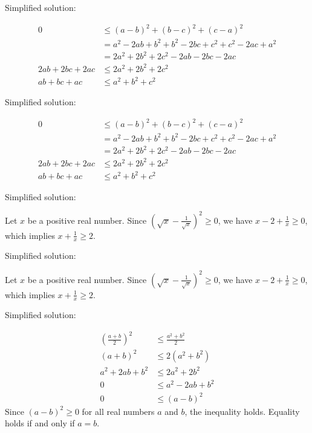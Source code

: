 \documentclass{article}
\begin{document}
Simplified solution:
\begin{tcolorbox}[colback=blue!10, width=\linewidth]
\begin{align*} 0 &\le (a-b)^2 + (b-c)^2 + (c-a)^2 \\ &= a^2 - 2ab + b^2 + b^2 - 2bc + c^2 + c^2 - 2ac + a^2 \\ &= 2a^2 + 2b^2 + 2c^2 - 2ab - 2bc - 2ac \\ 2ab + 2bc + 2ac &\le 2a^2 + 2b^2 + 2c^2 \\ ab + bc + ac &\le a^2 + b^2 + c^2 \end{align*}
\end{tcolorbox}



Simplified solution:
\begin{tcolorbox}[colback=blue!10, width=\linewidth]
\begin{align*} 0 &\le (a-b)^2 + (b-c)^2 + (c-a)^2 \\ &= a^2 - 2ab + b^2 + b^2 - 2bc + c^2 + c^2 - 2ac + a^2 \\ &= 2a^2 + 2b^2 + 2c^2 - 2ab - 2bc - 2ac \\ 2ab + 2bc + 2ac &\le 2a^2 + 2b^2 + 2c^2 \\ ab + bc + ac &\le a^2 + b^2 + c^2 \end{align*}
\end{tcolorbox}



Simplified solution:
\begin{tcolorbox}[colback=blue!10, width=\linewidth]
Let $x$ be a positive real number.  Since $(\sqrt{x} - \frac{1}{\sqrt{x}})^2 \ge 0$, we have $x - 2 + \frac{1}{x} \ge 0$, which implies $x + \frac{1}{x} \ge 2$.
\end{tcolorbox}



Simplified solution:
\begin{tcolorbox}[colback=blue!10, width=\linewidth]
Let $x$ be a positive real number.  Since $(\sqrt{x} - \frac{1}{\sqrt{x}})^2 \ge 0$, we have $x - 2 + \frac{1}{x} \ge 0$, which implies $x + \frac{1}{x} \ge 2$.
\end{tcolorbox}



Simplified solution:
\begin{tcolorbox}[colback=blue!10, width=\linewidth]
\[
\begin{aligned}
\left(\frac{a+b}{2}\right)^2 &\leq \frac{a^2+b^2}{2} \\
(a+b)^2 &\leq 2(a^2+b^2) \\
a^2 + 2ab + b^2 &\leq 2a^2 + 2b^2 \\
0 &\leq a^2 - 2ab + b^2 \\
0 &\leq (a-b)^2
\end{aligned}
\]
Since $(a-b)^2 \ge 0$ for all real numbers $a$ and $b$, the inequality holds. Equality holds if and only if $a=b$.

\end{tcolorbox}
\end{document}

